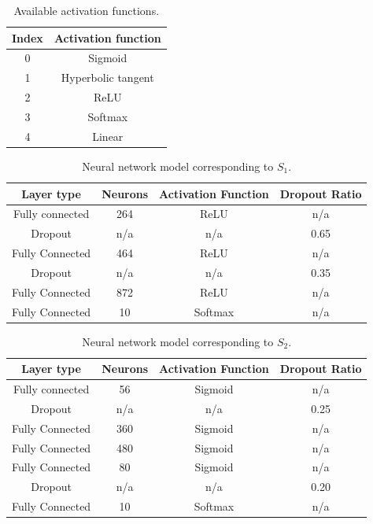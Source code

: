 \documentclass[12pt]{elsart}%
\begin{document}
\begin{table}[!htb]
\begin{center}
\begin{tabular}{| c | c |}
\hline
Index & Activation function \\
\hline
0 & Sigmoid \\
1 & Hyperbolic tangent \\
2 & ReLU \\
3 & Softmax \\
4 & Linear \\
\hline
\end{tabular}
\end{center}
\caption{Available activation functions.}
\label{table:index_to_activation_functions}
\end{table}

\begin{table}[!htb]
\begin{center}
\begin{tabular}{| c | c | c | c |}
\hline
Layer type & Neurons & Activation Function & Dropout Ratio \\
\hline
Fully connected & 264 & ReLU & n/a \\
Dropout & n/a & n/a & 0.65 \\
Fully Connected & 464 & ReLU & n/a\\
Dropout & n/a & n/a & 0.35\\
Fully Connected & 872 & ReLU & n/a\\
Fully Connected & 10 & Softmax & n/a\\
\hline
\end{tabular}
\end{center}
\caption{Neural network model corresponding to $S_1$.}
\label{table:neural_network_model_S1}
\end{table}

\begin{table}[!htb]
\begin{center}
\begin{tabular}{| c | c | c | c |}
\hline
Layer type & Neurons & Activation Function & Dropout Ratio \\
\hline
Fully connected & 56 & Sigmoid & n/a \\
Dropout & n/a & n/a & 0.25 \\
Fully Connected & 360 & Sigmoid & n/a\\
Fully Connected & 480 & Sigmoid & n/a\\
Fully Connected & 80 & Sigmoid & n/a\\
Dropout & n/a & n/a & 0.20\\
Fully Connected & 10 & Softmax & n/a\\
\hline
\end{tabular}
\end{center}
\caption{Neural network model corresponding to $S_2$.}
\label{table:neural_network_model_S2}
\end{table}
\end{document}
